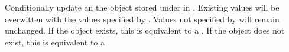 Conditionally update an the object stored under  in .
Existing values will be overwitten with the values specified by .
Values not specified by  will remain unchanged.  If the object
exists, this is equivalent to a .  If the object does not exist,
this is equivalent to a 


